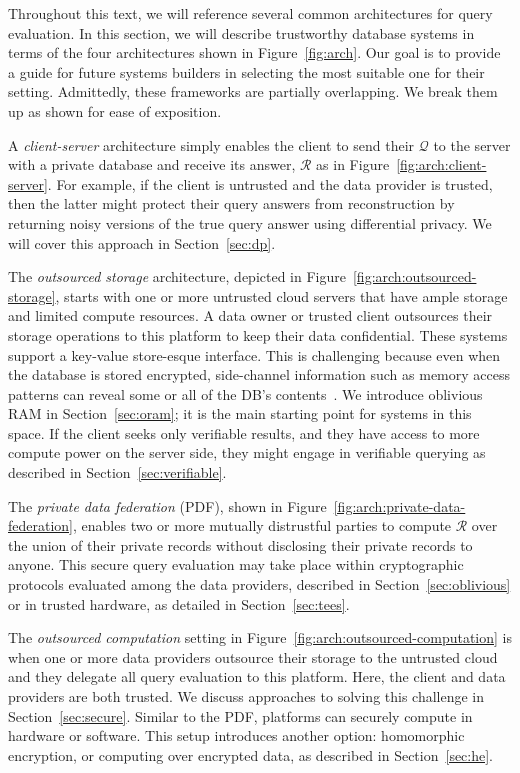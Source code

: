 \documentclass[11pt]{article}
\newcommand{\answer}{$\mathcal{R}$\xspace}
\newcommand{\query}{$\mathcal{Q}$\xspace}
\begin{document}
Throughout this text, we will reference several common architectures for query evaluation.  In this section, we will describe trustworthy database systems in terms of the  four architectures shown in Figure~\ref{fig:arch}. Our goal is to provide a  guide for future systems builders in selecting the most suitable one for their setting.  Admittedly, these frameworks are partially overlapping. We break them up as shown for ease of exposition.
 
A {\em client-server} architecture simply enables the client to send their  \query to the server with a private database and receive its answer, \answer as in Figure~\ref{fig:arch:client-server}.    For example, if the client is untrusted and the data provider is trusted, then the latter might protect their query answers from reconstruction by returning noisy versions of the true query answer using differential privacy.  We will cover this approach in Section~\ref{sec:dp}. 


The {\em outsourced storage} architecture, depicted in Figure~\ref{fig:arch:outsourced-storage}, starts with one or more untrusted cloud servers that have ample storage and limited compute resources. A data owner or trusted client outsources their storage operations to this platform to keep their data confidential.   These systems support a key-value store-esque interface. This is challenging because even when the database is stored encrypted, side-channel information such as memory access patterns can reveal some or all of the DB's contents~\cite{grubbs2016breaking,kellaris2016generic,markatou2019full}.  We introduce oblivious RAM in Section~\ref{sec:oram}; it is the main starting point for systems in this space.   If the client seeks only verifiable results, and they have access to more compute power on the server side,  they  might engage in verifiable querying as described in Section~\ref{sec:verifiable}.


The {\em private data federation} (PDF), shown in Figure~\ref{fig:arch:private-data-federation}, enables two or more mutually distrustful parties to compute \answer over the union of their private records without disclosing their private records to anyone.  This secure query evaluation may take place within cryptographic protocols evaluated among the data providers, described in Section~\ref{sec:oblivious} or in trusted hardware, as detailed in Section~\ref{sec:tees}.  


The {\em outsourced computation} setting in Figure~\ref{fig:arch:outsourced-computation} is when one or more data providers outsource their storage to the untrusted cloud and they delegate all query evaluation to this platform.  Here, the client and data providers are both trusted.  We discuss approaches to solving this challenge in Section~\ref{sec:secure}.  Similar to the PDF, platforms can securely compute in hardware or software.  This setup introduces another option: homomorphic encryption, or computing over encrypted data, as described in Section~\ref{sec:he}.
\end{document}
